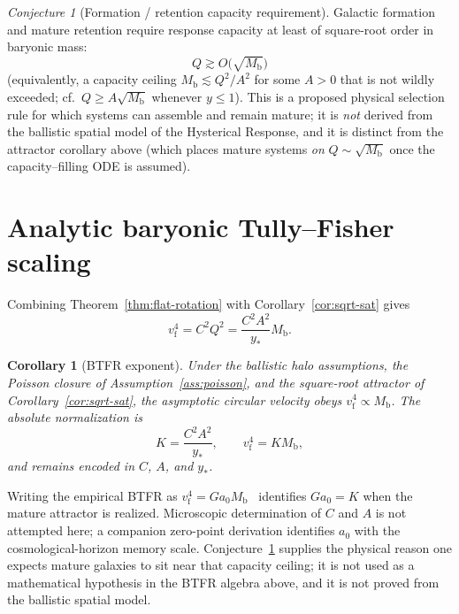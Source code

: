 \documentclass[11pt]{article}
\newtheorem{corollary}[theorem]{Corollary}
\theoremstyle{definition}
\theoremstyle{remark}
\newtheorem{conjecture}{Conjecture}
\newcommand{\Mb}{M_{\mathrm{b}}}
\newcommand{\vf}{v_{\mathrm{f}}}
\begin{document}
\begin{conjecture}[Formation / retention capacity requirement]
\label{conj:capacity}
Galactic formation and mature retention require response capacity at least of square-root order in baryonic mass:
\begin{equation}
  \boxed{Q\gtrsim O\bigl(\sqrt{\Mb}\bigr)}
\end{equation}
(equivalently, a capacity ceiling $\Mb\lesssim Q^{2}/A^{2}$ for some $A>0$ that is not wildly exceeded; cf.\ $Q\ge A\sqrt{\Mb}$ whenever $y\le1$).
This is a proposed physical selection rule for which systems can assemble and remain mature; it is \emph{not} derived from the ballistic spatial model of the Hysterical Response, and it is distinct from the attractor corollary above (which places mature systems \emph{on} $Q\sim\sqrt{\Mb}$ once the capacity--filling ODE is assumed).
\end{conjecture}

\section{Analytic baryonic Tully--Fisher scaling}
\label{sec:btfr}
Combining Theorem~\ref{thm:flat-rotation} with Corollary~\ref{cor:sqrt-sat} gives
\begin{equation}
  \vf^{4}=C^{2}Q^{2}=\frac{C^{2}A^{2}}{y_{\ast}}\Mb.
\end{equation}

\begin{corollary}[BTFR exponent]
\label{cor:btfr}
Under the ballistic halo assumptions, the Poisson closure of Assumption~\ref{ass:poisson}, and the square-root attractor of Corollary~\ref{cor:sqrt-sat}, the asymptotic circular velocity obeys $\vf^{4}\propto\Mb$.
The absolute normalization is
\begin{equation}
  K=\frac{C^{2}A^{2}}{y_{\ast}},
  \qquad\vf^{4}=K\Mb,
\end{equation}
and remains encoded in $C$, $A$, and $y_{\ast}$.
\end{corollary}

Writing the empirical BTFR as $\vf^{4}=Ga_{0}\Mb$~\cite{mcgaugh2012,lelli2016} identifies $Ga_{0}=K$ when the mature attractor is realized.
Microscopic determination of $C$ and $A$ is not attempted here; a companion zero-point derivation identifies $a_0$ with the cosmological-horizon memory scale.
Conjecture~\ref{conj:capacity} supplies the physical reason one expects mature galaxies to sit near that capacity ceiling; it is not used as a mathematical hypothesis in the BTFR algebra above, and it is not proved from the ballistic spatial model.
\end{document}
